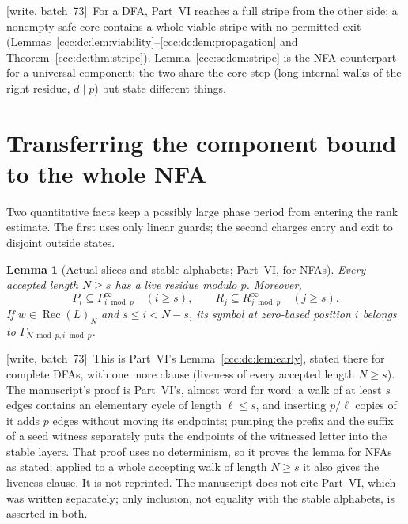 \documentclass[11pt,letterpaper]{article}
\newtheorem{lemma}[theorem]{Lemma}
\theoremstyle{definition}
\theoremstyle{remark}
\newcommand{\rec}{\operatorname{Rec}}
\newcommand{\wsevthree}{\textup{[write, batch~73]}}
\begin{document}
\wsevthree\ For a DFA, Part~VI reaches a full stripe from the other side: a
nonempty safe core contains a whole viable stripe with no permitted exit
(Lemmas~\ref{ccc:dc:lem:viability}--\ref{ccc:dc:lem:propagation} and
Theorem~\ref{ccc:dc:thm:stripe}). Lemma~\ref{ccc:sc:lem:stripe} is the NFA
counterpart for a universal component; the two share the core step (long
internal walks of the right residue, $d\mid p$) but state different
things.
\section{Transferring the component bound to the whole NFA}\label{ccc:sc:sec:transfer}

Two quantitative facts keep a possibly large phase period from entering the rank estimate. The first uses only linear guards; the second charges entry and exit to disjoint outside states.

\begin{lemma}[Actual slices and stable alphabets; Part~VI, for NFAs]\label{ccc:sc:lem:guards}
Every accepted length $N\ge s$ has a live residue modulo $p$. Moreover,
\[
 P_i\subseteq P_{i\bmod p}^\infty\quad(i\ge s),\qquad
 R_j\subseteq R_{j\bmod p}^\infty\quad(j\ge s).
\]
If $w\in\rec(L)_N$ and $s\le i<N-s$, its symbol at zero-based position $i$ belongs to $\Gamma_{N\bmod p,i\bmod p}$.
\end{lemma}
\noindent\wsevthree\ This is Part~VI's Lemma~\ref{ccc:dc:lem:early}, stated
there for complete DFAs, with one more clause (liveness of every accepted
length $N\ge s$). The manuscript's proof is Part~VI's, almost word for word:
a walk of at least $s$ edges contains an elementary cycle of length
$\ell\le s$, and inserting $p/\ell$ copies of it adds $p$ edges without moving
its endpoints; pumping the prefix and the suffix of a seed witness separately
puts the endpoints of the witnessed letter into the stable layers. That
proof uses no determinism, so it proves the lemma for NFAs as stated; applied
to a whole accepting walk of length $N\ge s$ it also gives the liveness
clause. It is not reprinted. The manuscript does not cite Part~VI, which was
written separately; only inclusion, not equality with the stable alphabets,
is asserted in both.
\end{document}
